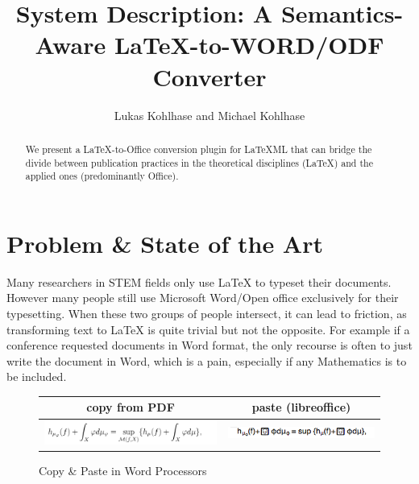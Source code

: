 \documentclass{llncs}
\title{System Description: A Semantics-Aware {\LaTeX}-to-WORD/ODF Converter}
\author{Lukas Kohlhase and Michael Kohlhase}
\institute{Mathematics/Computer Science\\
  Jacobs University Bremen}
\begin{document}
\maketitle
\begin{abstract}
  We present a {\LaTeX}-to-Office conversion plugin for {\LaTeX}ML that can bridge the
  divide between publication practices in the theoretical disciplines (\LaTeX) and the
  applied ones (predominantly Office). 
\end{abstract}

\section{Problem \& State of the Art}\label{sec:intro}

Many researchers in STEM fields only use {\LaTeX} to typeset their documents. However many
people still use Microsoft Word/Open office exclusively for their typesetting. When these
two groups of people intersect, it can lead to friction, as transforming text to {\LaTeX}
is quite trivial but not the opposite. For example if a conference requested documents in
Word format, the only recourse is often to just write the document in Word, which is a
pain, especially if any Mathematics is to be included.


\begin{figure}[ht]
  \begin{tabular}{|c|c|}\hline%
    copy from PDF & paste (libreoffice)\\\hline
    \includegraphics[width=6cm]{mathsnippet} & 
    \includegraphics[width=5cm]{mathsnippet-libreoffice}\\\hline
  \end{tabular}
\caption{Copy \& Paste in Word Processors}\label{fig:cnp}
\end{figure}
\end{document}
